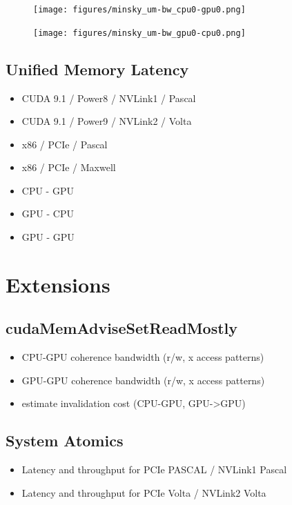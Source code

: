 \begin{figure}[ht]
    \centering
    \texttt{[image: figures/minsky\_um-bw\_cpu0-gpu0.png]}
    \caption[]{}
    \label{fig:}
\end{figure}

\begin{figure}[ht]
    \centering
    \texttt{[image: figures/minsky\_um-bw\_gpu0-cpu0.png]}
    \caption[]{}
    \label{fig:}
\end{figure}

\subsection{Unified Memory Latency}

\begin{itemize}
    \item CUDA 9.1 / Power8 / NVLink1 / Pascal
    \item CUDA 9.1 / Power9 / NVLink2 / Volta
    \item x86 / PCIe / Pascal
    \item x86 / PCIe / Maxwell
\end{itemize}

\begin{itemize}
    \item CPU - GPU
    \item GPU - CPU
    \item GPU - GPU
\end{itemize}


\section{Extensions}
\subsection{cudaMemAdviseSetReadMostly}
\begin{itemize}
    \item CPU-GPU coherence bandwidth (r/w, x access patterns)
    \item GPU-GPU coherence bandwidth (r/w, x access patterns)
    \item estimate invalidation cost (CPU-GPU, GPU->GPU)
\end{itemize}

\subsection{System Atomics}
\begin{itemize}
    \item Latency and throughput for PCIe PASCAL / NVLink1 Pascal 
    \item Latency and throughput for PCIe Volta / NVLink2 Volta
\end{itemize}

